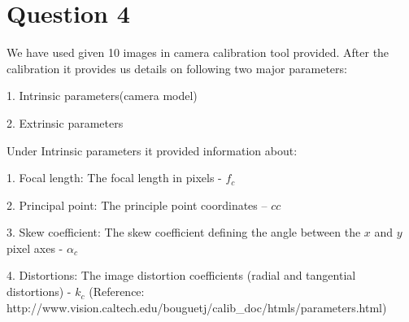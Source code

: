 \newpage
\section{Question 4}
	\noindent
	\newline
	We have used given 10 images in camera calibration tool provided. After the calibration it provides us details on following two major parameters:\newline
	
	\hspace{30} 1.	Intrinsic parameters(camera model)\newline
	
	\hspace{30} 2.	Extrinsic parameters\newline
	
	
	Under Intrinsic parameters it provided information about:\newline
	
	\hspace{30} 1. Focal length: The focal length in pixels - ${f_c}$\newline
	
	\hspace{30} 2. Principal point: The principle point coordinates – ${cc}$\newline
	
	\hspace{30} 3. Skew coefficient: The skew coefficient defining the angle between the ${x}$ and ${y}$ pixel axes - ${\alpha_c}$\newline
	
	\hspace{30} 4.	Distortions: The image distortion coefficients (radial and tangential distortions) - ${k_c}$\newline
	\newline
	(Reference: http://www.vision.caltech.edu/bouguetj/calib_doc/htmls/parameters.html)\newline
	\newline
	
